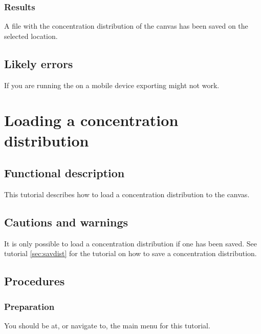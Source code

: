 \subsubsection{Results}
A file with the concentration distribution of the canvas has been saved on the selected location.

\subsection{Likely errors}
If you are running the \applicationname on a mobile device exporting might not work.


\section{Loading a concentration distribution}
\label{sec:loadDist}

\subsection{Functional description}
This tutorial describes how to load a concentration distribution to the canvas.

\subsection{Cautions and warnings}
It is only possible to load a concentration distribution if one has been saved. See tutorial \ref{sec:savdist} for the tutorial on how to save a concentration distribution.

\subsection{Procedures}
\subsubsection{Preparation}
You should be at, or navigate to, the main menu for this tutorial.

